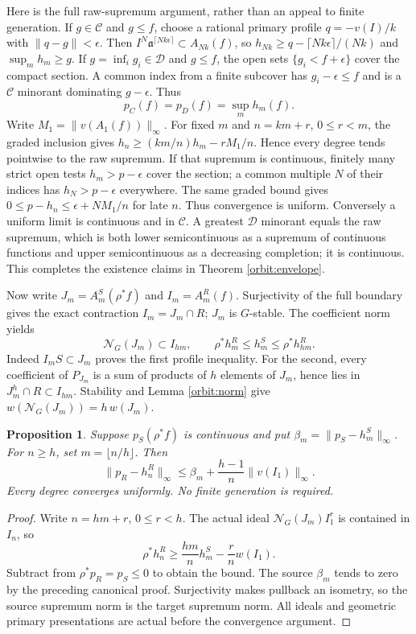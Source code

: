\documentclass[11pt]{article}
\newtheorem{proposition}[theorem]{Proposition}
\newcommand{\C}{\mathcal C}
\newcommand{\D}{\mathcal D}
\newcommand{\aideal}{\mathfrak a}
\newcommand{\Nideal}{\mathcal N_G}
\begin{document}
Here is the full raw-supremum argument, rather than an appeal to finite
generation. If $g\in\C$ and $g\le f$, choose a rational primary
profile $q=-v(I)/k$ with $\|q-g\|<\epsilon$. Then
$I^N\aideal^{\lceil Nk\epsilon\rceil}\subset A_{Nk}(f)$,
so $h_{Nk}\ge q-\lceil Nk\epsilon\rceil/(Nk)$ and
$\sup_m h_m\ge g$. If $g=\inf_i g_i\in\D$ and $g\le f$,
the open sets $\{g_i<f+\epsilon\}$ cover the compact section.
A common index from a finite subcover has $g_i-\epsilon\le f$ and
is a $\C$ minorant dominating $g-\epsilon$. Thus
\[
 p_C(f)=p_D(f)=\sup_m h_m(f).
\]
Write $M_1=\|v(A_1(f))\|_\infty$. For fixed $m$ and
$n=km+r$, $0\le r<m$, the graded inclusion gives
$h_n\ge(km/n)h_m-rM_1/n$. Hence every degree tends pointwise to
the raw supremum. If that supremum is continuous, finitely many strict
open tests $h_m>p-\epsilon$ cover the section; a common multiple $N$
of their indices has $h_N>p-\epsilon$ everywhere. The same graded
bound gives $0\le p-h_n\le\epsilon+NM_1/n$ for late $n$.
Thus convergence is uniform. Conversely a uniform limit is continuous
and in $\C$. A greatest $\D$ minorant equals the raw supremum,
which is both lower semicontinuous as a supremum of continuous functions
and upper semicontinuous as a decreasing completion; it is continuous.
This completes the existence claims in Theorem \ref{orbit:envelope}.

Now write $J_m=A_m^S(\rho^*f)$ and $I_m=A_m^R(f)$.
Surjectivity of the full boundary gives the exact contraction
$I_m=J_m\cap R$; $J_m$ is $G$-stable. The coefficient norm yields
\[
 \Nideal(J_m)\subset I_{hm},\qquad
 \rho^*h_m^R\le h_m^S\le\rho^*h_{hm}^R.
\]
Indeed $I_mS\subset J_m$ proves the first profile inequality.
For the second, every coefficient of $P_{J_m}$ is a sum of products
of $h$ elements of $J_m$, hence lies in $J_m^h\cap R\subset I_{hm}$.
Stability and Lemma \ref{orbit:norm} give
$w(\Nideal(J_m))=h\,w(J_m)$.

\begin{proposition}\label{orbit:error}
Suppose $p_S(\rho^*f)$ is continuous and put
$\beta_m=\|p_S-h_m^S\|_\infty$. For $n\ge h$, set
$m=\lfloor n/h\rfloor$. Then
\[
 \|p_R-h_n^R\|_\infty
 \le \beta_m+\frac{h-1}{n}\|v(I_1)\|_\infty.
\]
Every degree converges uniformly. No finite generation is required.
\end{proposition}
\begin{proof}
Write $n=hm+r$, $0\le r<h$. The actual ideal
$\Nideal(J_m)I_1^r$ is contained in $I_n$, so
\[
 \rho^*h_n^R\ge \frac{hm}{n}h_m^S-\frac{r}{n}w(I_1).
\]
Subtract from $\rho^*p_R=p_S\le0$ to obtain the bound. The source
$\beta_m$ tends to zero by the preceding canonical proof.
Surjectivity makes pullback an isometry, so the source supremum norm
is the target supremum norm. All ideals and geometric primary
presentations are actual before the convergence argument.
\end{proof}
\end{document}
